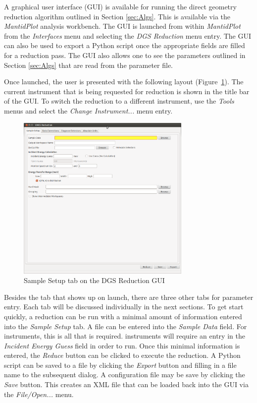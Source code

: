 A graphical user interface (GUI) is available for running the direct geometry reduction algorithm outlined in Section \ref{sec:Algs}. This is available via the \textit{MantidPlot} analysis workbench. The GUI is launched from within \textit{MantidPlot} from the \textit{Interfaces} menu and selecting the \textit{DGS Reduction} menu entry. The GUI can also be used to export a Python script once the appropriate fields are filled for a reduction pass. The GUI also allows one to see the parameters outlined in Section \ref{sec:Algs} that are read from the parameter file. 

Once launched, the user is presented with the following layout (Figure~\ref{fig:SamSet}). The current instrument that is being requested for reduction is shown in the title bar of the GUI. To switch the reduction to a different instrument, use the \textit{Tools} menus and select the \textit{Change Instrument...} menu entry. 
\begin{figure}[ht]
\centerline{\includegraphics[width=0.75\textwidth]{figures/SampleSetup.png}}
\caption{Sample Setup tab on the DGS Reduction GUI}
\label{fig:SamSet}
\end{figure}
Besides the tab that shows up on launch, there are three other tabs for parameter entry. Each tab will be discussed individually in the next sections. To get start quickly, a reduction can be run with a minimal amount of information entered into the \textit{Sample Setup} tab. A file can be entered into the \textit{Sample Data} field. For \sns{} instruments, this is all that is required. \isis{} instruments will require an entry in the \textit{Incident Energy Guess} field in order to run. Once this minimal information is entered, the \textit{Reduce} button can be clicked to execute the reduction. A Python script can be saved to a file by clicking the \textit{Export} button and filling in a file name to the subsequent dialog. A configuration file may be save by clicking the \textit{Save} button. This creates an XML file that can be loaded back into the GUI via the \textit{File/Open...} menu.

